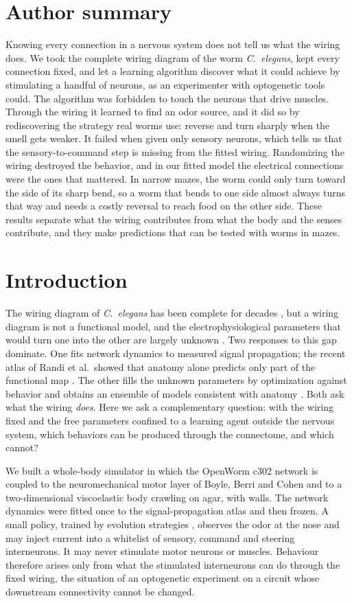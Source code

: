 \documentclass[11pt,a4paper]{article}
\newcommand{\Ce}{\textit{C.~elegans}}
\begin{document}
\section*{Author summary}
Knowing every connection in a nervous system does not tell us what the wiring does. We took the complete wiring diagram of the worm \Ce{}, kept every connection fixed, and let a learning algorithm discover what it could achieve by stimulating a handful of neurons, as an experimenter with optogenetic tools could. The algorithm was forbidden to touch the neurons that drive muscles. Through the wiring it learned to find an odor source, and it did so by rediscovering the strategy real worms use: reverse and turn sharply when the smell gets weaker. It failed when given only sensory neurons, which tells us that the sensory-to-command step is missing from the fitted wiring. Randomizing the wiring destroyed the behavior, and in our fitted model the electrical connections were the ones that mattered. In narrow mazes, the worm could only turn toward the side of its sharp bend, so a worm that bends to one side almost always turns that way and needs a costly reversal to reach food on the other side. These results separate what the wiring contributes from what the body and the senses contribute, and they make predictions that can be tested with worms in mazes.

\section*{Introduction}
The wiring diagram of \Ce{} has been complete for decades \cite{r4,r5}, but a wiring diagram is not a functional model, and the electrophysiological parameters that would turn one into the other are largely unknown \cite{r1,r6}. Two responses to this gap dominate. One fits network dynamics to measured signal propagation; the recent atlas of Randi et al.\ showed that anatomy alone predicts only part of the functional map \cite{r2}. The other fills the unknown parameters by optimization against behavior and obtains an ensemble of models consistent with anatomy \cite{r1}. Both ask what the wiring \emph{does}. Here we ask a complementary question: with the wiring fixed and the free parameters confined to a learning agent outside the nervous system, which behaviors can be produced through the connectome, and which cannot?

We built a whole-body simulator in which the OpenWorm c302 network \cite{r6} is coupled to the neuromechanical motor layer of Boyle, Berri and Cohen \cite{r7} and to a two-dimensional viscoelastic body crawling on agar, with walls. The network dynamics were fitted once to the signal-propagation atlas \cite{r2} and then frozen. A small policy, trained by evolution strategies \cite{r8}, observes the odor at the nose and may inject current into a whitelist of sensory, command and steering interneurons. It may never stimulate motor neurons or muscles. Behaviour therefore arises only from what the stimulated interneurons can do through the fixed wiring, the situation of an optogenetic experiment on a circuit whose downstream connectivity cannot be changed.
\end{document}
